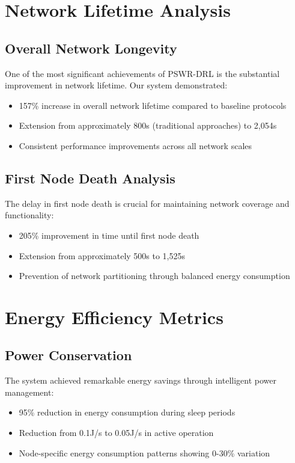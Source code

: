 \section{Network Lifetime Analysis}
\subsection{Overall Network Longevity}
One of the most significant achievements of PSWR-DRL is the substantial improvement in network lifetime. Our system demonstrated:

\begin{itemize}
\item 157\% increase in overall network lifetime compared to baseline protocols
\item Extension from approximately 800s (traditional approaches) to 2,054s
\item Consistent performance improvements across all network scales
\end{itemize}

\subsection{First Node Death Analysis}
The delay in first node death is crucial for maintaining network coverage and functionality:

\begin{itemize}
\item 205\% improvement in time until first node death
\item Extension from approximately 500s to 1,525s
\item Prevention of network partitioning through balanced energy consumption
\end{itemize}

\section{Energy Efficiency Metrics}
\subsection{Power Conservation}
The system achieved remarkable energy savings through intelligent power management:

\begin{itemize}
\item 95\% reduction in energy consumption during sleep periods
\item Reduction from 0.1J/s to 0.05J/s in active operation
\item Node-specific energy consumption patterns showing 0-30\% variation
\end{itemize}

